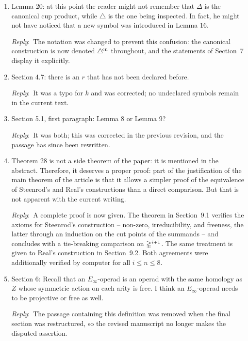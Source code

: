 \documentclass{amsart}
\newcommand{\ar}{\medskip\noindent\textit{Reply}:\ }
\begin{document}
\begin{enumerate}
		\ar In the current formulation the choice is parameterized by a function $\xi$ whose uniqueness is part of the statement (Lemma~6.1).

		\item Lemma 20: at this point the reader might not remember that \(\Delta\) is the canonical cup product, while \(\triangle\) is the one being inspected. In fact, he might not have noticed that a new symbol was introduced in Lemma 16.

		\ar The notation was changed to prevent this confusion: the canonical construction is now denoted $\triangle^{\!\mathrm{cn}}$ throughout, and the statements of Section~7 display it explicitly.

		\item Section 4.7: there is an \(r\) that has not been declared before.

		\ar It was a typo for $k$ and was corrected; no undeclared symbols remain in the current text.

		\item Section 5.1, first paragraph: Lemma 8 or Lemma 9?

		\ar It was both; this was corrected in the previous revision, and the passage has since been rewritten.

		\item Theorem 28 is not a side theorem of the paper: it is mentioned in the abstract. Therefore, it deserves a proper proof: part of the justification of the main theorem of the article is that it allows a simpler proof of the equivalence of Steenrod's and Real's constructions than a direct comparison. But that is not apparent with the current writing.

		\ar A complete proof is now given.
		The theorem in Section~9.1 verifies the axioms for Steenrod's construction -- non-zero, irreducibility, and freeness, the latter through an induction on the cut points of the summands -- and concludes with a tie-breaking comparison on $\mathbb{\Delta}^{i+1}$.
		The same treatment is given to Real's construction in Section~9.2.
		Both agreements were additionally verified by computer for all $i \leq n \leq 8$.

		\item Section 6: Recall that an \(E_\infty\)-operad is an operad with the same homology as \(Z\) whose symmetric action on each arity is free. I think an \(E_\infty\)-operad needs to be projective or free as well.

		\ar The passage containing this definition was removed when the final section was restructured, so the revised manuscript no longer makes the disputed assertion.


\end{enumerate}
\end{document}
